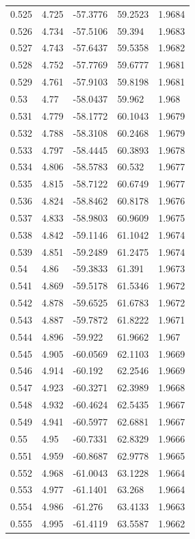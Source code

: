 \begin{tabular}{lllll}
0.525 & 4.725 & -57.3776 & 59.2523 & 1.9684 \\
0.526 & 4.734 & -57.5106 & 59.394 & 1.9683 \\
0.527 & 4.743 & -57.6437 & 59.5358 & 1.9682 \\
0.528 & 4.752 & -57.7769 & 59.6777 & 1.9681 \\
0.529 & 4.761 & -57.9103 & 59.8198 & 1.9681 \\
0.53 & 4.77 & -58.0437 & 59.962 & 1.968 \\
0.531 & 4.779 & -58.1772 & 60.1043 & 1.9679 \\
0.532 & 4.788 & -58.3108 & 60.2468 & 1.9679 \\
0.533 & 4.797 & -58.4445 & 60.3893 & 1.9678 \\
0.534 & 4.806 & -58.5783 & 60.532 & 1.9677 \\
0.535 & 4.815 & -58.7122 & 60.6749 & 1.9677 \\
0.536 & 4.824 & -58.8462 & 60.8178 & 1.9676 \\
0.537 & 4.833 & -58.9803 & 60.9609 & 1.9675 \\
0.538 & 4.842 & -59.1146 & 61.1042 & 1.9674 \\
0.539 & 4.851 & -59.2489 & 61.2475 & 1.9674 \\
0.54 & 4.86 & -59.3833 & 61.391 & 1.9673 \\
0.541 & 4.869 & -59.5178 & 61.5346 & 1.9672 \\
0.542 & 4.878 & -59.6525 & 61.6783 & 1.9672 \\
0.543 & 4.887 & -59.7872 & 61.8222 & 1.9671 \\
0.544 & 4.896 & -59.922 & 61.9662 & 1.967 \\
0.545 & 4.905 & -60.0569 & 62.1103 & 1.9669 \\
0.546 & 4.914 & -60.192 & 62.2546 & 1.9669 \\
0.547 & 4.923 & -60.3271 & 62.3989 & 1.9668 \\
0.548 & 4.932 & -60.4624 & 62.5435 & 1.9667 \\
0.549 & 4.941 & -60.5977 & 62.6881 & 1.9667 \\
0.55 & 4.95 & -60.7331 & 62.8329 & 1.9666 \\
0.551 & 4.959 & -60.8687 & 62.9778 & 1.9665 \\
0.552 & 4.968 & -61.0043 & 63.1228 & 1.9664 \\
0.553 & 4.977 & -61.1401 & 63.268 & 1.9664 \\
0.554 & 4.986 & -61.276 & 63.4133 & 1.9663 \\
0.555 & 4.995 & -61.4119 & 63.5587 & 1.9662 \\

\end{tabular}
